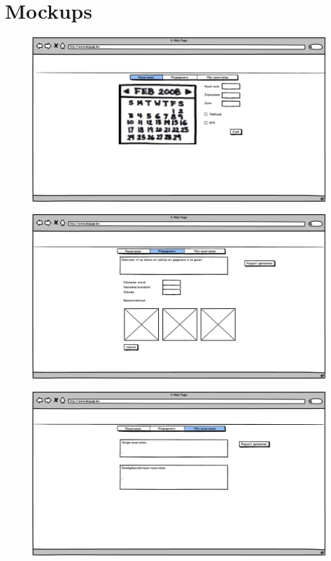 \documentclass[11pt,a4paper,oneside]{article}
\begin{document}
\section{Mockups}
\begin{center}

\begin{figure}[H]\includegraphics[width=\textwidth]{../../mockups/delen_reserveren.png}\end{figure}

\begin{figure}[H]\includegraphics[width=\textwidth]{../../mockups/delen_ritgegevens.png}\end{figure}

\begin{figure}[H]\includegraphics[width=\textwidth]{../../mockups/delen_mijnreservaties.png}\end{figure}


\end{center}
\end{document}
